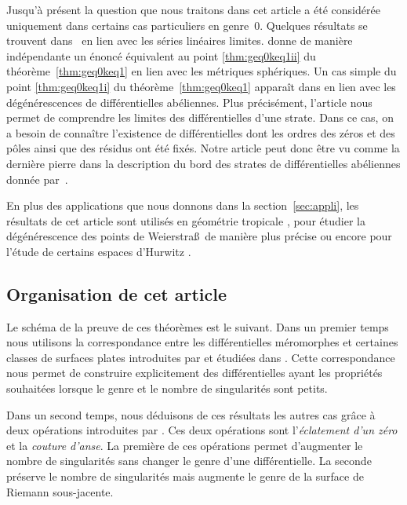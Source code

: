 \documentclass[11pt]{article}
\numberwithin{equation}{section}\renewcommand{\proofname}{Démonstration}
\newcommand{\Weierstrass}{Weierstra\ss{}}
\theoremstyle{definition}
\begin{document}
Jusqu'à présent la question que nous traitons dans cet article a été considérée uniquement dans certains cas particuliers en genre~$0$. Quelques résultats se trouvent dans~\cite[\S2]{eiha} en lien avec les séries linéaires limites. \cite{Erm} donne de manière indépendante un énoncé équivalent au point \eqref{thm:geq0keq1ii} du théorème~\ref{thm:geq0keq1} en lien avec les métriques sphériques. Un cas simple du point \eqref{thm:geq0keq1i} du théorème~\ref{thm:geq0keq1} apparaît dans \cite[Lem.\,3.6]{BCGGM} en lien avec les dégénérescences de différentielles abéliennes. Plus précisément, l'article \cite{BCGGM} nous permet de comprendre les limites des différentielles d'une strate. Dans ce cas, on a besoin de connaître l'existence de différentielles dont les ordres des zéros et des pôles ainsi que des résidus ont été fixés. Notre article peut donc être vu comme la dernière pierre dans la description du bord des strates de différentielles abéliennes donnée par~\cite{BCGGM}.

En plus des applications que nous donnons dans la section~\ref{sec:appli}, les résultats de cet article sont utilisés en géométrie tropicale \cite{MUW}, pour étudier la dégénérescence des points de \Weierstrass~de manière plus précise \cite{genWei} ou encore pour l'étude de certains espaces d'Hurwitz \cite{mulSecond}.

\subsection{Organisation de cet article}

Le schéma de la preuve de ces théorèmes est le suivant. Dans un premier temps nous utilisons la correspondance entre les différentielles méromorphes et certaines classes de surfaces plates introduites par \cite{Bo} et étudiées dans \cite{tahar}. Cette correspondance nous permet de construire explicitement des différentielles ayant les propriétés souhaitées lorsque le genre et le nombre de singularités sont petits.

Dans un second temps, nous déduisons de ces résultats les autres cas grâce à deux opérations introduites par \cite{kozo}. Ces deux opérations sont l'\emph{éclatement d'un zéro} et la \emph{couture d'anse}. La première de ces opérations permet d'augmenter le nombre de singularités sans changer le genre d'une différentielle. La seconde préserve le nombre de singularités mais augmente le genre de la surface de Riemann sous-jacente.
\end{document}
